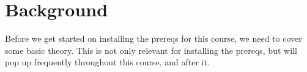 \chapter{Background}

Before we get started on installing the prereqs for this course, we need to cover some basic theory. This is not only relevant for installing the prereqs, but will pop up frequently throughout this course, and after it.







